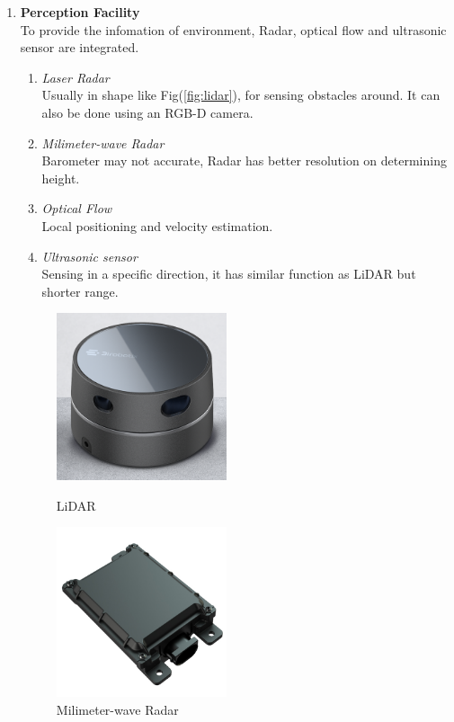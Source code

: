 \documentclass[paper=a4, fontsize=11pt]{scrartcl} %
\numberwithin{equation}{section} %
\numberwithin{figure}{section} %
\numberwithin{table}{section} %
\begin{document}
\begin{enumerate}
		\item \textbf{Perception Facility}\\
			To provide the infomation of environment, Radar, optical flow and ultrasonic sensor are integrated.
			
			\begin{enumerate}
				\item \textit{Laser Radar}\\
					Usually in shape like Fig(\ref{fig:lidar}), for sensing obstacles around. It can also be done using an RGB-D camera.
				\item \textit{Milimeter-wave Radar}\\
					Barometer may not accurate, Radar has better resolution on determining height.
				\item \textit{Optical Flow}\\
					Local positioning and velocity estimation.
				\item \textit{Ultrasonic sensor}\\
					Sensing in a specific direction, it has similar function as LiDAR but shorter range.
			\end{enumerate}
		
			\begin{figure}[!htbp]
				\centering
				\begin{minipage}[t]{0.48\textwidth}
					\centering
					\includegraphics[width=5cm]{pic/lidar.png}
					\caption{LiDAR}
					\label{fig:lidar}
				\end{minipage}
				\begin{minipage}[t]{0.48\textwidth}
					\centering
					\includegraphics[width=5cm]{pic/radar.jpg}
					\caption{Milimeter-wave Radar}
					\label{fig:mm-wave}
				\end{minipage}
			\end{figure}
			

\end{enumerate}
\end{document}
